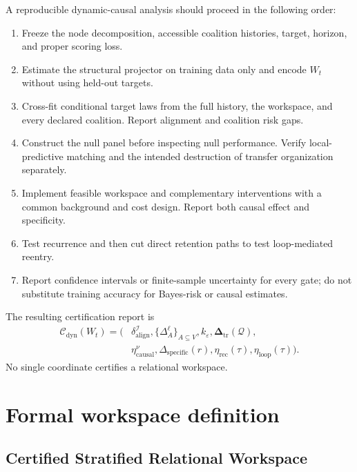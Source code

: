 A reproducible dynamic-causal analysis should proceed in the following order:
\begin{enumerate}
\item Freeze the node decomposition, accessible coalition histories, target,
 horizon, and proper scoring loss.
\item Estimate the structural projector on training data only and encode
 \(W_t\) without using held-out targets.
\item Cross-fit conditional target laws from the full history, the workspace,
 and every declared coalition. Report alignment and coalition risk gaps.
\item Construct the null panel before inspecting null performance. Verify
 local-predictive matching and the intended destruction of transfer
 organization separately.
\item Implement feasible workspace and complementary interventions with a
 common background and cost design. Report both causal effect and
 specificity.
\item Test recurrence and then cut direct retention paths to test loop-mediated
 reentry.
\item Report confidence intervals or finite-sample uncertainty for every gate;
 do not substitute training accuracy for Bayes-risk or causal estimates.
\end{enumerate}

The resulting certification report is
\[
\boxed{
\begin{aligned}
\mathcal C_{\mathrm{dyn}}(W_t)
=\bigl(&
\delta_{\mathrm{align}}^{\mathcal I},
\{\Delta_A^\ell\}_{A\subseteq V},
 k_\varepsilon,
\boldsymbol\Delta_{\mathrm{tr}}(\mathcal Q),\\
&\eta_{\mathrm{causal}}^\nu,
\Delta_{\mathrm{specific}}(r),
\eta_{\mathrm{rec}}(\tau),
\eta_{\mathrm{loop}}(\tau)
\bigr).
\end{aligned}
}
\]
No single coordinate certifies a relational workspace.


\chapter{Formal workspace definition}\label{SRWT:book:chapter-75}


\section{Certified Stratified Relational Workspace}

